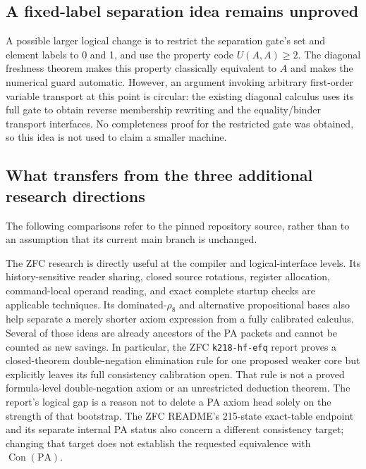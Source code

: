 \subsection{A fixed-label separation idea remains unproved}
A possible larger logical change is to restrict the separation gate's
set and element labels to 0 and 1, and use the property code
$U(A,A)\geq2$. The diagonal freshness theorem makes this property
classically equivalent to $A$ and makes the numerical guard automatic.
However, an argument invoking arbitrary first-order variable transport
at this point is circular: the existing diagonal calculus uses its full
gate to obtain reverse membership rewriting and the equality/binder
transport interfaces. No completeness proof for the restricted gate
was obtained, so this idea is not used to claim a smaller machine.

\subsection{What transfers from the three additional research directions}
The following comparisons refer to the pinned repository source, rather
than to an assumption that its current main branch is unchanged.

The ZFC research is directly useful at the compiler and logical-interface
levels. Its history-sensitive reader sharing, closed source rotations,
register allocation, command-local operand reading, and exact complete
startup checks are applicable techniques. Its dominated-$\rho_8$ and
alternative propositional bases also help separate a merely shorter
axiom expression from a fully calibrated calculus. Several of those
ideas are already ancestors of the PA packets and cannot be counted as
new savings. In particular, the ZFC \texttt{k218-hf-efq} report proves a
closed-theorem double-negation elimination rule for one proposed weaker
core but explicitly leaves its full consistency calibration open. That
rule is not a proved formula-level double-negation axiom or an
unrestricted deduction theorem. The report's logical gap is a reason
not to delete a PA axiom head solely on the strength of that bootstrap.
The ZFC README's 215-state exact-table endpoint and its separate internal
PA status also concern a different consistency target; changing that
target does not establish the requested equivalence with
$\operatorname{Con}(\mathrm{PA})$.

